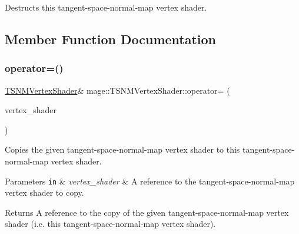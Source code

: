 Destructs this tangent-\/space-\/normal-\/map vertex shader. 

\subsection{Member Function Documentation}
\hypertarget{classmage_1_1_t_s_n_m_vertex_shader_ad3d444a889fcb9a736d0c0d2fba4ea88}{}\label{classmage_1_1_t_s_n_m_vertex_shader_ad3d444a889fcb9a736d0c0d2fba4ea88} 
\subsubsection{\texorpdfstring{operator=()}{operator=()}\hspace{0.1cm}{\footnotesize\ttfamily [1/2]}}
{\footnotesize\ttfamily \hyperlink{classmage_1_1_t_s_n_m_vertex_shader}{T\+S\+N\+M\+Vertex\+Shader}\& mage\+::\+T\+S\+N\+M\+Vertex\+Shader\+::operator= (\begin{DoxyParamCaption}\item[{const \hyperlink{classmage_1_1_t_s_n_m_vertex_shader}{T\+S\+N\+M\+Vertex\+Shader} \&}]{vertex\+\_\+shader }\end{DoxyParamCaption})\hspace{0.3cm}{\ttfamily [delete]}}

Copies the given tangent-\/space-\/normal-\/map vertex shader to this tangent-\/space-\/normal-\/map vertex shader.


\begin{DoxyParams}[1]{Parameters}
\mbox{\tt in}  & {\em vertex\+\_\+shader} & A reference to the tangent-\/space-\/normal-\/map vertex shader to copy. \\
\hline
\end{DoxyParams}
\begin{DoxyReturn}{Returns}
A reference to the copy of the given tangent-\/space-\/normal-\/map vertex shader (i.\+e. this tangent-\/space-\/normal-\/map vertex shader). 
\end{DoxyReturn}
\hypertarget{classmage_1_1_t_s_n_m_vertex_shader_a84e30879d000172f309d7ec2f27c3ed1}{}\label{classmage_1_1_t_s_n_m_vertex_shader_a84e30879d000172f309d7ec2f27c3ed1} 
